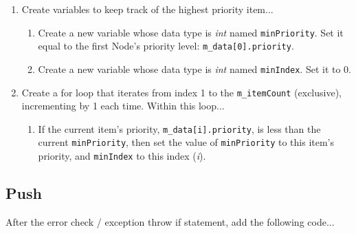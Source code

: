 \documentclass[a4paper,12pt,oneside]{book}
\begin{document}
    \begin{enumerate}
        \item   Create variables to keep track of the highest priority item...
            \begin{enumerate}
                \item   Create a new variable whose data type is \textit{int} named \texttt{minPriority}.
                    Set it equal to the first Node's priority level: \texttt{m\_data[0].priority}.
                \item   Create a new variable whose data type is \textit{int} named \texttt{minIndex}.
                    Set it to 0.
            \end{enumerate}

            \item Create a for loop that iterates from index 1 to the \texttt{m\_itemCount} (exclusive),
                incrementing by 1 each time. Within this loop...
            \begin{enumerate}
                \item   If the current item's priority, \texttt{m\_data[i].priority}, is less than the current \texttt{minPriority},
                    then set the value of \texttt{minPriority} to this item's priority, and \texttt{minIndex} to this index (\textit{i}).
            \end{enumerate}
    \end{enumerate}

    \subsection{Push}

    After the error check / exception throw if statement, add the following code...
\end{document}
